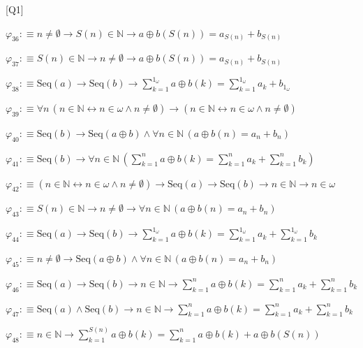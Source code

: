 \begin{fullproof}{[Q1]}
\begin{abbrevlist}
\item $\varphi_{36} :\equiv n \neq \emptyset \to S(n) \in \mathbb{N} \to a \oplus b(S(n)) = a_{S(n)} + b_{S(n)}$
\item $\varphi_{37} :\equiv S(n) \in \mathbb{N} \to n \neq \emptyset \to a \oplus b(S(n)) = a_{S(n)} + b_{S(n)}$
\item $\varphi_{38} :\equiv \mathrm{Seq}(a) \to \mathrm{Seq}(b) \to {\textstyle\sum_{k=1}^{1_{\omega}} a \oplus b(k)} = {\textstyle\sum_{k=1}^{1_{\omega}} a_{k}} + b_{1_{\omega}}$
\item $\varphi_{39} :\equiv \forall n\,(n \in \mathbb{N} \leftrightarrow n \in \omega \land n \neq \emptyset) \to (n \in \mathbb{N} \leftrightarrow n \in \omega \land n \neq \emptyset)$
\item $\varphi_{40} :\equiv \mathrm{Seq}(b) \to \mathrm{Seq}(a \oplus b) \land \forall n \in \mathbb{N}\,(a \oplus b(n) = a_{n} + b_{n})$
\item $\varphi_{41} :\equiv \mathrm{Seq}(b) \to \forall n \in \mathbb{N}\,({\textstyle\sum_{k=1}^{n} a \oplus b(k)} = {\textstyle\sum_{k=1}^{n} a_{k}} + {\textstyle\sum_{k=1}^{n} b_{k}})$
\item $\varphi_{42} :\equiv (n \in \mathbb{N} \leftrightarrow n \in \omega \land n \neq \emptyset) \to \mathrm{Seq}(a) \to \mathrm{Seq}(b) \to n \in \mathbb{N} \to n \in \omega$
\item $\varphi_{43} :\equiv S(n) \in \mathbb{N} \to n \neq \emptyset \to \forall n \in \mathbb{N}\,(a \oplus b(n) = a_{n} + b_{n})$
\item $\varphi_{44} :\equiv \mathrm{Seq}(a) \to \mathrm{Seq}(b) \to {\textstyle\sum_{k=1}^{1_{\omega}} a \oplus b(k)} = {\textstyle\sum_{k=1}^{1_{\omega}} a_{k}} + {\textstyle\sum_{k=1}^{1_{\omega}} b_{k}}$
\item $\varphi_{45} :\equiv n \neq \emptyset \to \mathrm{Seq}(a \oplus b) \land \forall n \in \mathbb{N}\,(a \oplus b(n) = a_{n} + b_{n})$
\item $\varphi_{46} :\equiv \mathrm{Seq}(a) \to \mathrm{Seq}(b) \to n \in \mathbb{N} \to {\textstyle\sum_{k=1}^{n} a \oplus b(k)} = {\textstyle\sum_{k=1}^{n} a_{k}} + {\textstyle\sum_{k=1}^{n} b_{k}}$
\item $\varphi_{47} :\equiv \mathrm{Seq}(a) \land \mathrm{Seq}(b) \to n \in \mathbb{N} \to {\textstyle\sum_{k=1}^{n} a \oplus b(k)} = {\textstyle\sum_{k=1}^{n} a_{k}} + {\textstyle\sum_{k=1}^{n} b_{k}}$
\item $\varphi_{48} :\equiv n \in \mathbb{N} \to {\textstyle\sum_{k=1}^{S(n)} a \oplus b(k)} = {\textstyle\sum_{k=1}^{n} a \oplus b(k)} + a \oplus b(S(n))$

\end{abbrevlist}
\end{fullproof}
